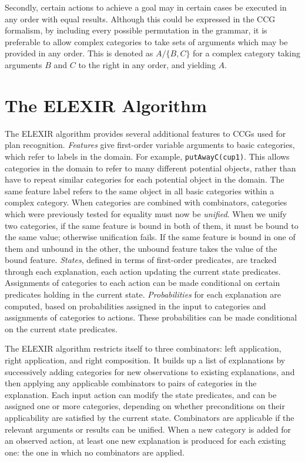 Secondly, certain actions to achieve a goal may in certain cases be executed in any order with equal results. Although this could be expressed in the CCG formalism, by including every possible permutation in the grammar, it is preferable to allow complex categories to take sets of arguments which may be provided in any order. This is denoted as $A/\{B, C\}$ for a complex category taking arguments $B$ and $C$ to the right in any order, and yielding $A$\cite{bib:ccg2}.

\section{The ELEXIR Algorithm}

The ELEXIR algorithm\cite{bib:elexir} provides several additional features to CCGs used for plan recognition. \emph{Features} give first-order variable arguments to basic categories, which refer to labels in the domain. For example, \texttt{putAwayC(cup1)}. This allows categories in the domain to refer to many different potential objects, rather than have to repeat similar categories for each potential object in the domain. The same feature label refers to the same object in all basic categories within a complex category.
When categories are combined with combinators, categories which were previously tested for equality must now be \emph{unified}. When we unify two categories, if the same feature is bound in both of them, it must be bound to the same value; otherwise unification fails. If the same feature is bound in one of them and unbound in the other, the unbound feature takes the value of the bound feature. \emph{States}, defined in terms of first-order predicates, are tracked through each explanation, 
each 
action updating the current state predicates. Assignments of categories to each action can be made conditional on certain 
predicates holding in the current state. \emph{Probabilities} for each explanation are computed, based on probabilities assigned in the input to categories and assignments of categories to actions. These probabilities can be made conditional on the current state predicates.

The ELEXIR algorithm restricts itself to three combinators: left application, right application, and right composition. It builds up a list of explanations by successively adding categories for new observations to existing explanations, and then applying any applicable combinators to pairs of categories in the explanation.
Each input action can modify the state predicates, and can be assigned one or more categories, depending on whether preconditions on their applicability are satisfied by the current state. Combinators are applicable if the relevant arguments or results can be unified. When a new category is added for an observed action, at least one new explanation is produced for each existing one: the one in which no combinators are applied.

